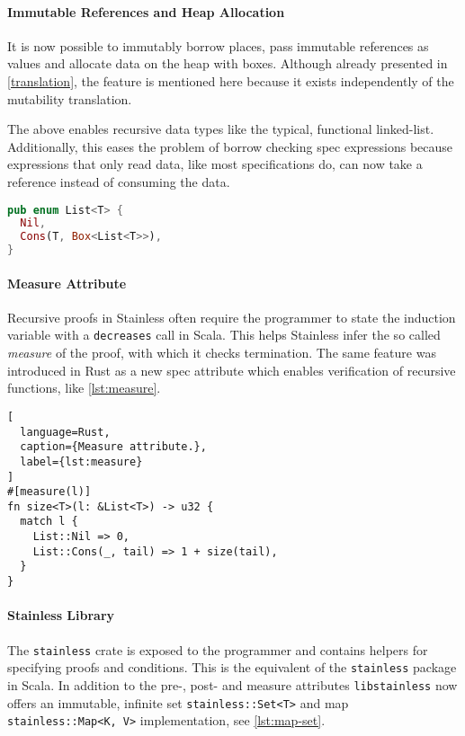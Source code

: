 \paragraph{Immutable References and Heap Allocation}

It is now possible to immutably borrow places, pass immutable references as
values and allocate data on the heap with boxes. Although already presented in
\autoref{translation}, the feature is mentioned here because it exists
independently of the mutability translation.

The above enables recursive data types like the typical, functional linked-list.
Additionally, this eases the problem of borrow checking spec expressions because
expressions that only read data, like most specifications do, can now take a
reference instead of consuming the data.

\begin{lstlisting}[language=Rust, style=short]
pub enum List<T> {
  Nil,
  Cons(T, Box<List<T>>),
}
\end{lstlisting}

\paragraph{Measure Attribute}

Recursive proofs in Stainless often require the programmer to state the
induction variable with a \lstinline!decreases! call in Scala. This helps
Stainless infer the so called \emph{measure} of the proof, with which it checks
termination. The same feature was introduced in Rust as a new spec attribute
which enables verification of recursive functions, like \autoref{lst:measure}.

\begin{lstlisting}[
  language=Rust,
  caption={Measure attribute.},
  label={lst:measure}
]
#[measure(l)]
fn size<T>(l: &List<T>) -> u32 {
  match l {
    List::Nil => 0,
    List::Cons(_, tail) => 1 + size(tail),
  }
}
\end{lstlisting}

\paragraph{Stainless Library}

The \lstinline!stainless! crate is exposed to the programmer and contains
helpers for specifying proofs and conditions. This is the equivalent of the
\lstinline!stainless! package in Scala. In addition to the pre-, post- and
measure attributes \lstinline!libstainless! now offers an immutable, infinite
set \passthrough{\lstinline!stainless::Set<T>!} and map
\passthrough{\lstinline!stainless::Map<K, V>!} implementation, see
\autoref{lst:map-set}.

